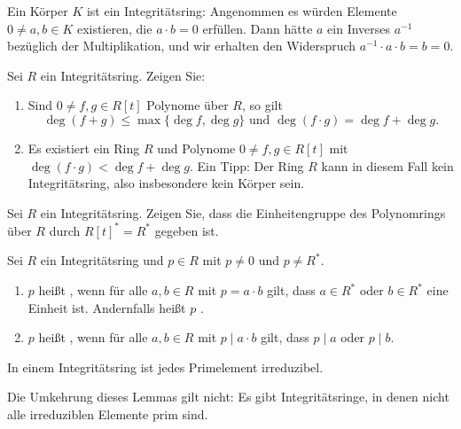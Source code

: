 \begin{example}\label{expl:kintdomain}
 Ein Körper $K$ ist ein Integritätsring: Angenommen es würden Elemente $0 ≠ a, b \in K$ existieren, die $a \cdot b = 0$ erfüllen. Dann hätte $a$ ein Inverses $a^{-1}$ bezüglich der Multiplikation, und wir erhalten den Widerspruch $a^{-1} \cdot a \cdot b = b = 0$.
\end{example}


\begin{exercise}\label{ex:degree}
 Sei $R$ ein Integritätsring. Zeigen Sie:
 \begin{enumerate}
  \item Sind $0 ≠ f, g \in R[t]$ Polynome über $R$, so gilt
 \[\deg(f + g) \leq \max\{\deg f, \deg g\} \text{ und } \deg (f \cdot g) = \deg f + \deg g.\]
 \item  Es existiert ein Ring $R$ und Polynome $0 ≠ f, g \in R[t]$ mit $\deg (f \cdot g) < \deg f + \deg g$. Ein Tipp: Der Ring $R$ kann in diesem Fall kein Integritätsring, also insbesondere kein Körper sein.
 \end{enumerate}
\end{exercise}

\begin{exercise}\label{ex:groupofunits}
 Sei $R$ ein Integritätsring. Zeigen Sie, dass die Einheitengruppe des Polynomrings über $R$ durch $R[t]^* = R^*$ gegeben ist. 
\end{exercise}

\begin{definition}
 Sei $R$ ein Integritätsring und $p \in R$ mit $p ≠ 0$ und $p ≠ R^*$. 
 \begin{enumerate}
  \item $p$ heißt , wenn für alle $a, b \in R$ mit $p = a \cdot b$ gilt, dass $a \in R^*$ oder $b \in R^*$ eine Einheit ist. Andernfalls heißt $p$ .
  \item $p$ heißt , wenn für alle $a, b \in R$ mit $p \mid a \cdot b$ gilt, dass $p \mid a$ oder $p\mid b$.
 \end{enumerate}

\end{definition}

\begin{lemma}
In einem Integritätsring ist jedes Primelement irreduzibel.
\end{lemma}

\begin{remark}
 Die Umkehrung dieses Lemmas gilt nicht: Es gibt Integritätsringe, in denen nicht alle irreduziblen Elemente prim sind.
\end{remark}

